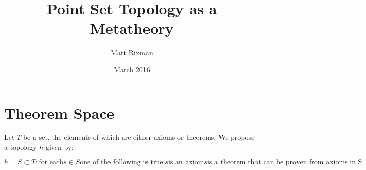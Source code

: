 \documentclass{article}
\title{Point Set Topology as a Metatheory}
\author{Matt Rixman }
\date{March 2016}
\begin{document}
\maketitle

\section{Theorem Space}

Let \(T\) be a set, the elements of which are either axioms or theorems.
We propose a topology \(h\) given by:

\[h = {S \subset T : \text{for each} s \in S \text{one of the following is true:}
        s \text{is an axiom}
    s \text{is a theorem that can be proven from axioms in S}}\]
\end{document}
